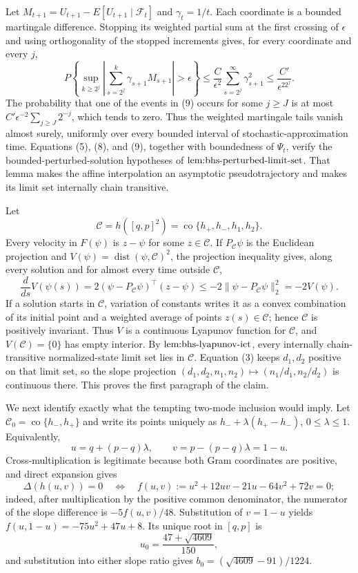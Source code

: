 Let \(M_{t+1}=U_{t+1}-E[U_{t+1}\mid\mathcal F_t]\) and \(\gamma_t=1/t\).  Each coordinate is a bounded martingale difference.  Stopping its weighted partial sum at the first crossing of \(\epsilon\) and using orthogonality of the stopped increments gives, for every coordinate and every \(j\),
\[
 P\left\{\sup_{k\geq2^j}\left|\sum_{s=2^j}^k\gamma_{s+1}M_{s+1}\right|>\epsilon\right\}
 \leq \frac{C}{\epsilon^2}\sum_{s=2^j}^{\infty}\gamma_{s+1}^2
 \leq\frac{C'}{\epsilon^22^j}. \tag{9}
\]
The probability that one of the events in (9) occurs for some \(j\geq J\) is at most \(C'\epsilon^{-2}\sum_{j\geq J}2^{-j}\), which tends to zero.  Thus the weighted martingale tails vanish almost surely, uniformly over every bounded interval of stochastic-approximation time.  Equations (5), (8), and (9), together with boundedness of \(\Psi_t\), verify the bounded-perturbed-solution hypotheses of \(\textnormal{lem:bhs-perturbed-limit-set}\).  That lemma makes the affine interpolation an asymptotic pseudotrajectory and makes its limit set internally chain transitive.

Let
\[
 \mathcal C=h([q,p]^2)=\operatorname{co}\{h_+,h_-,h_1,h_2\}.
\]
Every velocity in \(F(\psi)\) is \(z-\psi\) for some \(z\in\mathcal C\).  If \(P_{\mathcal C}\psi\) is the Euclidean projection and \(V(\psi)=\operatorname{dist}(\psi,\mathcal C)^2\), the projection inequality gives, along every solution and for almost every time outside \(\mathcal C\),
\[
 \frac{d}{ds}V(\psi(s))
 =2(\psi-P_{\mathcal C}\psi)^\top(z-\psi)
 \leq-2\|\psi-P_{\mathcal C}\psi\|_2^2=-2V(\psi). \tag{10}
\]
If a solution starts in \(\mathcal C\), variation of constants writes it as a convex combination of its initial point and a weighted average of points \(z(s)\in\mathcal C\); hence \(\mathcal C\) is positively invariant.  Thus \(V\) is a continuous Lyapunov function for \(\mathcal C\), and \(V(\mathcal C)=\{0\}\) has empty interior.  By \(\textnormal{lem:bhs-lyapunov-ict}\), every internally chain-transitive normalized-state limit set lies in \(\mathcal C\).  Equation (3) keeps \(d_1,d_2\) positive on that limit set, so the slope projection \((d_1,d_2,n_1,n_2)\mapsto(n_1/d_1,n_2/d_2)\) is continuous there.  This proves the first paragraph of the claim.

We next identify exactly what the tempting two-mode inclusion would imply.  Let \(\mathcal C_0=\operatorname{co}\{h_-,h_+\}\) and write its points uniquely as \(h_-+\lambda(h_+-h_-)\), \(0\leq\lambda\leq1\).  Equivalently,
\[
 u=q+(p-q)\lambda,\qquad v=p-(p-q)\lambda=1-u. \tag{11}
\]
Cross-multiplication is legitimate because both Gram coordinates are positive, and direct expansion gives
\[
 \Delta(h(u,v))=0
 \quad\Longleftrightarrow\quad
 f(u,v):=u^2+12uv-21u-64v^2+72v=0; \tag{12}
\]
indeed, after multiplication by the positive common denominator, the numerator of the slope difference is \(-5f(u,v)/48\).  Substitution of \(v=1-u\) yields \(f(u,1-u)=-75u^2+47u+8\).  Its unique root in \([q,p]\) is
\[
 u_0=\frac{47+\sqrt{4609}}{150},
\]
and substitution into either slope ratio gives \(b_0=(\sqrt{4609}-91)/1224\).

